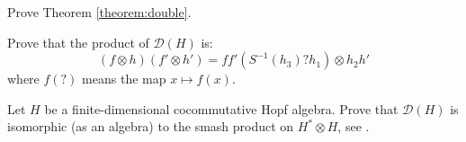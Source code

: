\begin{exercise}
Prove Theorem \ref{theorem:double}.
\end{exercise}


\begin{exercise}
Prove that  the product of $\mathcal{D}(H)$ is: 
\[
(f\otimes h)(f'\otimes h') = ff'(S^{-1}(h_{3})?h_{1})\otimes h_{2}h'
\]
where $f(?)$ means the map $x\mapsto f(x)$. 
\end{exercise}


\begin{exercise}
Let $H$ be a finite-dimensional cocommutative Hopf algebra. Prove that
$\mathcal{D}(H)$ is isomorphic (as an algebra) to the smash product on
$H^{*}\otimes H$, see \cite[10.3.10]{MR1243637}.
\end{exercise}

